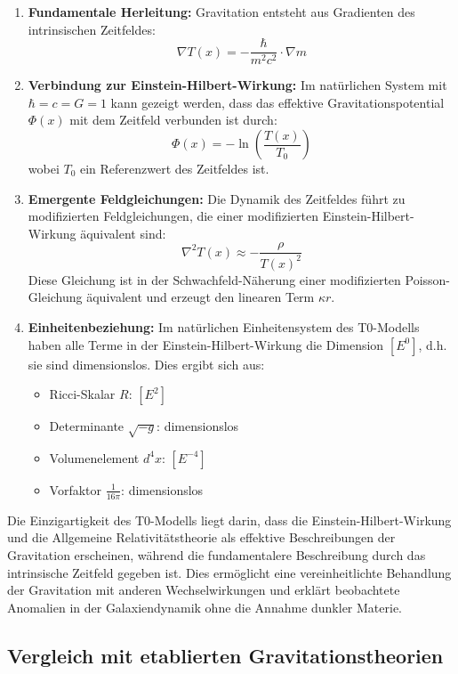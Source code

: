 \documentclass[12pt,a4paper]{article}
\begin{document}
\begin{enumerate}
	\item \textbf{Fundamentale Herleitung:} Gravitation entsteht aus Gradienten des intrinsischen Zeitfeldes:
	\[
	\nabla T(x) = -\frac{\hbar}{m^2c^2} \cdot \nabla m
	\]
	
	\item \textbf{Verbindung zur Einstein-Hilbert-Wirkung:} Im natürlichen System mit $\hbar = c = G = 1$ kann gezeigt werden, dass das effektive Gravitationspotential $\Phi(x)$ mit dem Zeitfeld verbunden ist durch:
	\[
	\Phi(x) = -\ln\left(\frac{T(x)}{T_0}\right)
	\]
	wobei $T_0$ ein Referenzwert des Zeitfeldes ist.
	
	\item \textbf{Emergente Feldgleichungen:} Die Dynamik des Zeitfeldes führt zu modifizierten Feldgleichungen, die einer modifizierten Einstein-Hilbert-Wirkung äquivalent sind:
	\[
	\nabla^2T(x) \approx -\frac{\rho}{T(x)^2}
	\]
	Diese Gleichung ist in der Schwachfeld-Näherung einer modifizierten Poisson-Gleichung äquivalent und erzeugt den linearen Term $\kappa r$.
	
	\item \textbf{Einheitenbeziehung:} Im natürlichen Einheitensystem des T0-Modells haben alle Terme in der Einstein-Hilbert-Wirkung die Dimension $[E^0]$, d.h. sie sind dimensionslos. Dies ergibt sich aus:
	\begin{itemize}
		\item Ricci-Skalar $R$: $[E^2]$
		\item Determinante $\sqrt{-g}$: dimensionslos
		\item Volumenelement $d^4x$: $[E^{-4}]$
		\item Vorfaktor $\frac{1}{16\pi}$: dimensionslos
	\end{itemize}
\end{enumerate}

Die Einzigartigkeit des T0-Modells liegt darin, dass die Einstein-Hilbert-Wirkung und die Allgemeine Relativitätstheorie als effektive Beschreibungen der Gravitation erscheinen, während die fundamentalere Beschreibung durch das intrinsische Zeitfeld gegeben ist. Dies ermöglicht eine vereinheitlichte Behandlung der Gravitation mit anderen Wechselwirkungen und erklärt beobachtete Anomalien in der Galaxiendynamik ohne die Annahme dunkler Materie.

\subsection*{Vergleich mit etablierten Gravitationstheorien}
\end{document}
